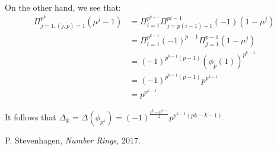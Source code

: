 \documentclass{article}
\newcommand{\numberset}{\mathbb}
\newcommand{\K}{\numberset{K}}
\begin{document}
On the other hand, we see that:
\begin{align*}
  \Pi_{j=1,(j,p)=1}^{p^k} (\mu^j-1) & =\Pi_{i=1}^{p^{k-1}}\Pi_{j=p(i-1)+1}^{pi-1} (-1)(1-\mu^j) \\
  & =\Pi_{i=1}^{p^{k-1}} (-1)^{p-1}\Pi_{j=1}^{p-1} (1-\mu^j) \\
  & =(-1)^{p^{k-1}(p-1)}(\phi_p(1))^{p^{k-1}} \\
  & =(-1)^{p^{k-1}(p-1)}p^{p^{k-1}} \\
  & =p^{p^{k-1}}
\end{align*}

It follows that $\Delta_{\K}=\Delta(\phi_{p^k})=(-1)^{\frac{p^k-p^{k-1}}{2}}p^{p^{k-1}(pk-k-1)}$.


\begin{thebibliography}{9}
		P. Stevenhagen,
		\textit{Number Rings},
		2017.
\end{thebibliography}
\end{document}
